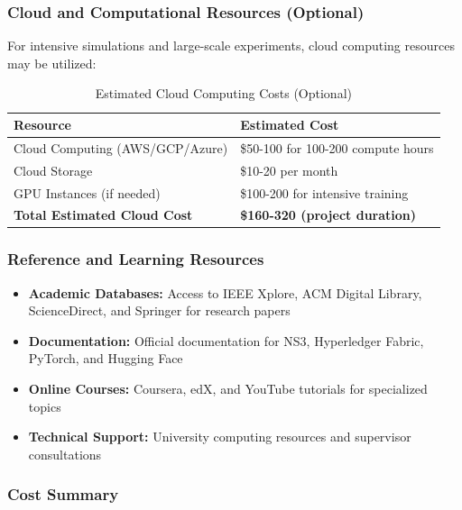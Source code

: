 \subsubsection{Cloud and Computational Resources (Optional)}

For intensive simulations and large-scale experiments, cloud computing resources may be utilized:

\begin{table}[htbp]
\centering
\begin{tabular}{|l|l|}
\hline
\textbf{Resource} & \textbf{Estimated Cost} \\
\hline
Cloud Computing (AWS/GCP/Azure) & \$50-100 for 100-200 compute hours \\
\hline
Cloud Storage & \$10-20 per month \\
\hline
GPU Instances (if needed) & \$100-200 for intensive training \\
\hline
\textbf{Total Estimated Cloud Cost} & \textbf{\$160-320 (project duration)} \\
\hline
\end{tabular}
\caption{Estimated Cloud Computing Costs (Optional)}
\label{tab:cloud}
\end{table}

\subsubsection{Reference and Learning Resources}

\begin{itemize}
    \item \textbf{Academic Databases:} Access to IEEE Xplore, ACM Digital Library, ScienceDirect, and Springer for research papers
    \item \textbf{Documentation:} Official documentation for NS3, Hyperledger Fabric, PyTorch, and Hugging Face
    \item \textbf{Online Courses:} Coursera, edX, and YouTube tutorials for specialized topics
    \item \textbf{Technical Support:} University computing resources and supervisor consultations
\end{itemize}

\subsubsection{Cost Summary}

